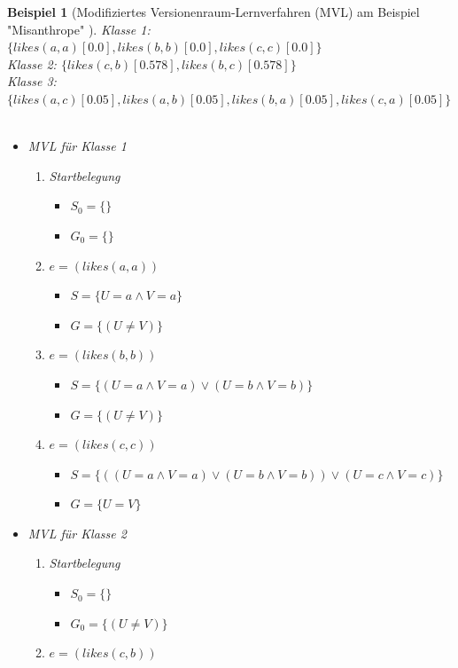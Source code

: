 \documentclass[a4paper, 11pt]{book}
\newtheorem{Bsp}{Beispiel}[section]
\begin{document}
\begin{Bsp}[Modifiziertes Versionenraum-Lernverfahren (MVL) am Beispiel "{}Misanthrope"{} ]	
\noindent
Klasse 1: $ \{likes(a,a)[0.0], likes(b,b)[0.0], likes(c,c)[0.0]\} $\\
Klasse 2: $ \{likes(c,b)[0.578], likes(b,c)[0.578]\} $\\
Klasse 3: $ \{likes(a,c)[0.05], likes(a,b)[0.05], likes(b,a)[0.05], likes(c,a)[0.05]\} $\\
\\
\noindent
\begin{itemize}
	\item MVL für Klasse 1
	\begin{enumerate}
		\item Startbelegung
		\begin{itemize}
			\item $ S_0 = \{\}$ 
			\item $ G_0 = \{\} $
		\end{itemize}
		\item $ e = (likes(a,a)) $
		\begin{itemize}
			\item $ S = \{U = a \land V = a\}$ 
			\item $ G = \{(U \neq V)\} $
		\end{itemize}
		\item $ e = (likes(b,b)) $
		\begin{itemize}
			\item $ S = \{(U = a \land V = a) \lor (U = b \land V = b)\}$ 
			\item $ G = \{(U \neq V)\} $
		\end{itemize}
		\item $ e = (likes(c,c)) $
		\begin{itemize}
		    \item $ S = \{((U = a \land V = a) \lor (U = b \land V = b)) \lor (U = c \land V = c)\}$ 
			\item $ G = \{U = V\} $
		\end{itemize}	
	\end{enumerate}
	\item MVL für Klasse 2
	\begin{enumerate}
		\item Startbelegung
		\begin{itemize}
			\item $ S_0 = \{\}$ 
			\item $ G_0 = \{(U \neq V)\} $
		\end{itemize}
		\item $ e = (likes(c,b)) $

\end{enumerate}
\end{itemize}
\end{Bsp}
\end{document}
